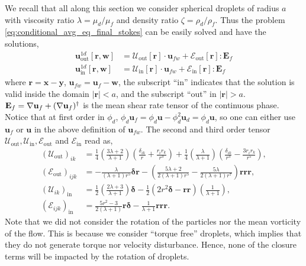We recall that all along this section we consider spherical droplets of radius $a$ with viscosity ratio $\lambda = \mu_d /\mu_f$ and density ratio $\zeta =\rho_d /\rho_f$. 
Thus the problem \ref{eq:conditional_avg_eq_final_stokes} can be easily solved and have the solutions, 
\begin{align}
    \label{eq:singularity_solution_out}
    \textbf{u}_\text{out}^{1d}[\textbf{r},\textbf{w}]
    &= 
    \mathcal{U}_\text{out}[\textbf{r}] \cdot \textbf{u}_{fw}
    + \mathcal{E}_\text{out}[\textbf{r}]: \textbf{E}_{f}\\
    \textbf{u}_\text{in}^{1d}[\textbf{r},\textbf{w}]
    &= 
    \mathcal{U}_\text{in}[\textbf{r}] \cdot \textbf{u}_{fw}
    + \mathcal{E}_\text{in}[\textbf{r}] : \textbf{E}_{f}
    \label{eq:singularity_solution_in}
\end{align}
where $\textbf{r} = \textbf{x} - \textbf{y}$, $\textbf{u}_{fw} = \textbf{u}_f - \textbf{w}$, the subscript ``in'' indicates that the solution is valid inside the domain $|\textbf{r}| <a$, and the subscript ``out'' in $|\textbf{r}|>a$. 
$\textbf{E}_f = \mathbf{\nabla} \textbf{u}_f + (\mathbf{\nabla} \textbf{u}_f)^\dagger$ is the mean shear rate tensor of the continuous phase. 
Notice that at first order in $\phi_d$, $\phi_d\textbf{u}_f =\phi_d\textbf{u} - \phi_d^2 \textbf{u}_d = \phi_d\textbf{u}$, so one can either use $\textbf{u}_f$ or $\textbf{u}$ in the above definition of $\textbf{u}_{fw}$. 
The second and third order tensor $\mathcal{U}_\text{out},\mathcal{U}_\text{in},\mathcal{E}_\text{out}$ and $\mathcal{E}_\text{in}$ read as, 
\begin{align}
    (\mathcal{U}_{\text{out}})_{ik} &= 
    \frac{1}{4}\left(\frac{3\lambda + 2}{\lambda +1}\right)
    \left(\frac{\delta_{ik}}{r} + \frac{r_ir_k}{r^3}\right) 
    + 
    \frac{1}{4}\left(\frac{\lambda}{\lambda +1}\right)
    \left(\frac{\delta_{ik}}{r^3} - \frac{3r_ir_k}{r^5}\right),  \\
    (\mathcal{E}_{\text{out}})_{ijk}
    &=
    -\frac{\lambda}{(\lambda + 1)r^5} \bm\delta\textbf{r}
    -\left(\frac{5\lambda +2}{2(\lambda +1 )r^5} - \frac{5\lambda}{2(\lambda+1)r^7}\right) \textbf{rrr},\\
    (\mathcal{U}_{ik})_\text{in} &= 
    \frac{1}{2}\left(\frac{2\lambda +3}{\lambda +1}\right)\bm\delta
    -\frac{1}{2} (2r^2 \bm\delta - \textbf{rr})
    \left(\frac{1}{\lambda +1}\right),\\
    (\mathcal{E}_{ijk})_\text{in}
    &=
    \frac{5r^2 -3}{2(\lambda +1)} \textbf{r}\bm\delta
    - \frac{1}{\lambda+1}\textbf{rrr}. 
\end{align}
Note that we did not consider the rotation of the particles nor the mean vorticity of the flow. 
This is because we consider ``torque free'' droplets, which implies that they do not generate torque nor velocity disturbance. 
Hence, none of the closure terms will be impacted by the rotation of droplets. 

